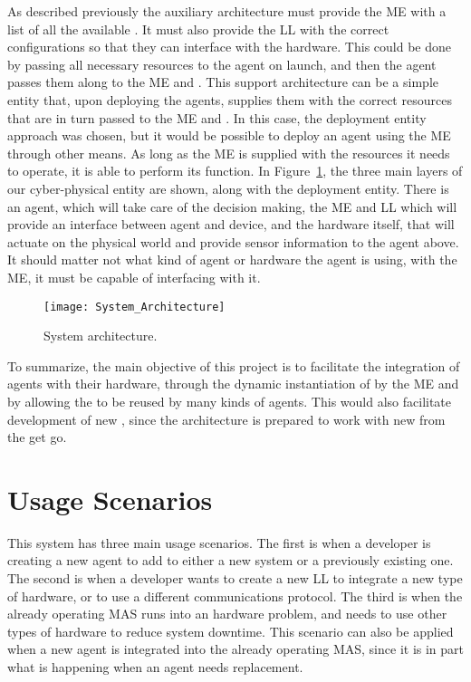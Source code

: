 As described previously the auxiliary architecture must provide the \acrshort{ME} with a list of all the available . It must also provide the \acrshort{LL} with the correct configurations so that they can interface with the hardware. This could be done by passing all necessary resources to the agent on launch, and then the agent passes them along to the \acrshort{ME} and . This support architecture can be a simple entity that, upon deploying the agents, supplies them with the correct resources that are in turn passed to the \acrshort{ME} and . In this case, the deployment entity approach was chosen, but it would be possible to deploy an agent using the \acrshort{ME} through other means. As long as the \acrshort{ME} is supplied with the resources it needs to operate, it is able to perform its function. In Figure~\ref{fig:system_architecture}, the three main layers of our cyber-physical entity are shown, along with the deployment entity. There is an agent, which will take care of the decision making, the \acrshort{ME} and \acrshort{LL} which will provide an interface between agent and device, and the hardware itself, that will actuate on the physical world and provide sensor information to the agent above. It should matter not what kind of agent or hardware the agent is using, with the \acrlong{ME}, it must be capable of interfacing with it.

\begin{figure}[h!]
	\centering
	\texttt{[image: System\_Architecture]}
	\caption{System architecture.}
	\label{fig:system_architecture}
\end{figure}

To summarize, the main objective of this project is to facilitate the integration of agents with their hardware, through the dynamic instantiation of  by the \acrlong{ME} and by allowing the  to be reused by many kinds of agents. This would also facilitate development of new , since the architecture is prepared to work with new  from the get go.

\section{Usage Scenarios}
\label{sec:use_cases}

This system has three main usage scenarios. The first is when a developer is creating a new agent to add to either a new system or a previously existing one. The second is when a developer wants to create a new \acrshort{LL} to integrate a new type of hardware, or to use a different communications protocol. The third is when the already operating \acrshort{MAS} runs into an hardware problem, and needs to use other types of hardware to reduce system downtime. This scenario can also be applied when a new agent is integrated into the already operating \acrshort{MAS}, since it is in part what is happening when an agent needs replacement.\\

